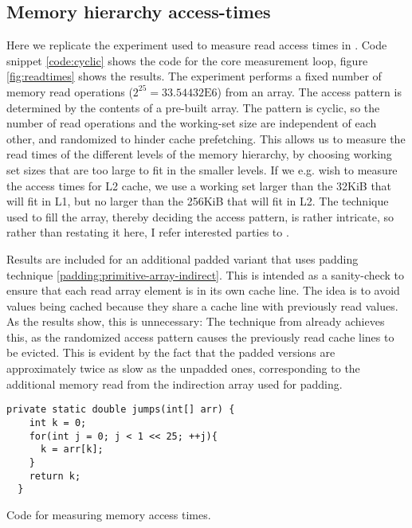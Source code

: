 \subsection{Memory hierarchy access-times}
Here we replicate the experiment used to measure read access times in
\cite{mystery}. Code snippet \ref{code:cyclic} shows the code for the core
measurement loop, figure \ref{fig:readtimes} shows the results. The experiment
performs a fixed number of memory read operations ($2^{25} =
33.54432\mathrm{E}6$) from an array. The access pattern is determined by the
contents of a pre-built array. The pattern is cyclic, so the number of read
operations and the working-set size are independent of each other, and
randomized to hinder cache prefetching. This allows us to measure the read times
of the different levels of the memory hierarchy, by choosing working set sizes
that are too large to fit in the smaller levels. If we e.g. wish to measure the
access times for L2 cache, we use a working set larger than the 32KiB that will
fit in L1, but no larger than the 256KiB that will fit in L2. The technique used
to fill the array, thereby deciding the access pattern, is rather intricate, so
rather than restating it here, I refer interested parties to \cite{mystery}.

Results are included for an additional padded variant that uses padding
technique \ref{padding:primitive-array-indirect}. This is intended as a
sanity-check to ensure that each read array
element is in its own cache line. The idea is to avoid values being cached
because they share a cache line with previously read values. As the results
show, this is unnecessary: The technique from \cite{mystery} already achieves
this, as the randomized access pattern causes the previously read cache lines to
be evicted. This is evident by the fact that the padded versions are
approximately twice as slow as the unpadded ones, corresponding to the
additional memory read from the indirection array used for padding.

\begin{code}[h]
\begin{Verbatim}[frame=single]
  private static double jumps(int[] arr) {
    int k = 0;
    for(int j = 0; j < 1 << 25; ++j){
      k = arr[k];
    }
    return k;
  }
\end{Verbatim}
	\caption{Code for measuring memory access times.}
	\label{code:cyclic}
\end{code}

